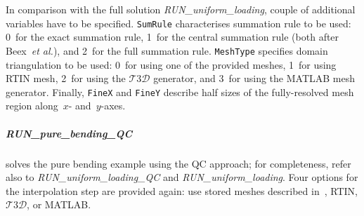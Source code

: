 \documentclass[preprint,12pt,authoryear]{elsarticle}
\begin{document}
In comparison with the full solution \emph{RUN\_uniform\_loading}, couple of additional variables have to be specified. \texttt{SumRule} characterises summation rule to be used: 0~for the exact summation rule, 1~for the central summation rule (both after Beex~\emph{et al.}), and 2~for the full summation rule. \texttt{MeshType} specifies domain triangulation to be used: 0~for using one of the provided meshes, 1~for using RTIN mesh, 2~for using the \href{http://ksm.fsv.cvut.cz/~dr/t3d.html}{$\mathcal{T}3\mathcal{D}$} generator, and 3~for using the MATLAB mesh generator. Finally, \texttt{FineX} and \texttt{FineY} describe half sizes of the fully-resolved mesh region along~$x$- and~$y$-axes.
%
%
\subparagraph{RUN\_pure\_bending\_QC} solves the pure bending example using the QC approach; for completeness, refer also to \emph{RUN\_uniform\_loading\_QC} and \emph{RUN\_uniform\_loading}. Four options for the interpolation step are provided again: use stored meshes described in~\cite[Fig.~9]{RokosQC}, RTIN, \href{http://ksm.fsv.cvut.cz/~dr/t3d.html}{$\mathcal{T}3\mathcal{D}$}, or MATLAB. 
\end{document}
